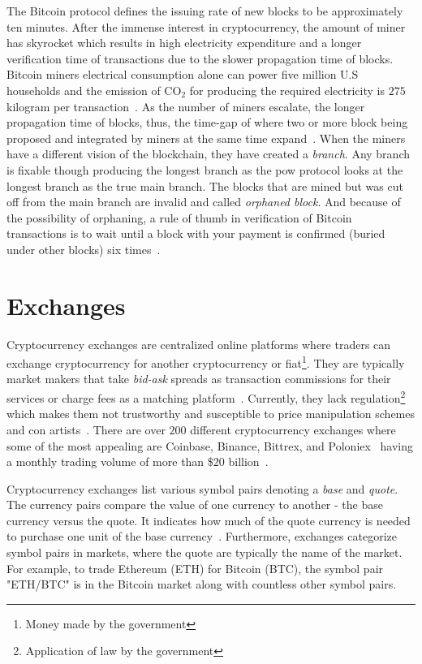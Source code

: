 The Bitcoin protocol defines the issuing rate of new blocks to be approximately ten minutes. After the immense interest in cryptocurrency, the amount of miner has skyrocket which results in high electricity expenditure and a longer verification time of transactions due to the slower propagation time of blocks. Bitcoin miners electrical consumption alone can power five million U.S households and the emission of CO$_2$ for producing the required electricity is $275$ kilogram per transaction~\cite{bitcoin_power}. As the number of miners escalate, the longer propagation time of blocks, thus, the time-gap of where two or more block being proposed and integrated by miners at the same time expand~\cite{trans_fee}. When the miners have a different vision of the blockchain, they have created a \emph{branch}. Any branch is fixable though producing the longest branch as the \ac{pow} protocol looks at the longest branch as the true main branch. The blocks that are mined but was cut off from the main branch are invalid and called \emph{orphaned block}. And because of the possibility of orphaning, a rule of thumb in verification of Bitcoin transactions is to wait until a block with your payment is confirmed (buried under other blocks) six times~\cite{bitcoin_verification_1, bitcoin_verification_2}.

\section{Exchanges}\label{sec:exchanges}
Cryptocurrency exchanges are centralized online platforms where traders can exchange cryptocurrency for another cryptocurrency or fiat\footnote{Money made by the government\cite{fiat}}. They are typically market makers that take \emph{bid-ask} spreads as transaction commissions for their services or charge fees as a matching platform~\cite{norton_rose}. Currently, they lack regulation\footnote{Application of law by the government} which makes them not trustworthy and susceptible to price manipulation schemes and con artists~\cite{exchange_scammers, exchange_scammers_2}. There are over $200$ different cryptocurrency exchanges where some of the most appealing are Coinbase, Binance, Bittrex, and Poloniex~\cite{exchange_best_1, exchange_best_2} having a monthly trading volume of more than \$$20$ billion~\cite{coinmarketcap_exchange}.

Cryptocurrency exchanges list various symbol pairs denoting a \emph{base} and \emph{quote}. The currency pairs compare the value of one currency to another - the base currency versus the quote. It indicates how much of the quote currency is needed to purchase one unit of the base currency~\cite{investopedia_cryptocurrency}. Furthermore, exchanges categorize symbol pairs in markets, where the quote are typically the name of the market. For example, to trade Ethereum (ETH) for Bitcoin (BTC), the symbol pair "ETH/BTC" is in the Bitcoin market along with countless other symbol pairs.

